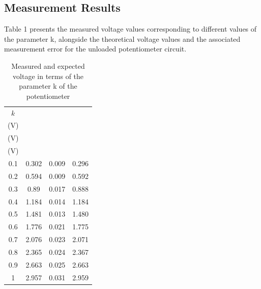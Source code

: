 \documentclass[a4paper]{article}
\begin{document}
\subsection{Measurement Results}
Table 1 presents the measured voltage values corresponding to different values of 
the parameter k, alongside the theoretical voltage values and 
the associated measurement error for the unloaded potentiometer circuit.
\begin{table}[!ht]
    \centering
    \label{tab:1}
    \caption{Measured and expected voltage in terms of the parameter k of the potentiometer}
    \begin{tabular}{|c c c c|} 
    \hline
    $k$ & \makecell{$V_{unloaded}$ \\ (V)} & \makecell{$\Delta V_{unloaded}$ \\ (V)} &
    \makecell{$V_{expected}$ \\ (V)}  \\ 
    \hline
    0.1                                       & 0.302      &  0.009          & 0.296      \\
    0.2                                       & 0.594      &   0.009         & 0.592      \\
    0.3                                       & 0.89       &   0.017         & 0.888      \\
    0.4                                       & 1.184      &  0.014          & 1.184      \\
    0.5                                       & 1.481      &  0.013          & 1.480      \\
    0.6                                       & 1.776      &  0.021          & 1.775      \\
    0.7                                       & 2.076      &  0.023          & 2.071      \\
    0.8                                       & 2.365      &  0.024          & 2.367      \\
    0.9                                       & 2.663      &  0.025          & 2.663      \\
    1                                         & 2.957      &  0.031          & 2.959      \\
    \hline
    \end{tabular}
    \end{table}
\newpage
\end{document}
